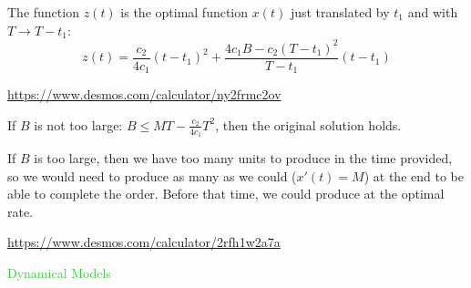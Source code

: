 \documentclass{workbook}
\begin{document}
\begin{solution}
\begin{slide}
\begin{parts}
	The function $z(t)$ is the optimal function $x(t)$ just translated by $t_1$ and with $T \to T-t_1$:
		\[ 
			z(t) = \frac{c_2}{4c_1} (t-t_1)^2 + \frac{4c_1 B-c_2 (T-t_1)^2}{T-t_1} (t-t_1)
		\]

	\url{https://www.desmos.com/calculator/ny2frmc2ov}
	
	\item If $B$ is not too large: $B\leq MT-\frac{c_{2}}{4c_{1}}T^{2}$, then the original solution holds.
		
		If $B$ is too large, then we have too many units to produce in the time provided, so we would need to produce as many as we could ($x'(t)=M$) at the end to be able to complete the order. 
		Before that time, we could produce at the optimal rate.

		\url{https://www.desmos.com/calculator/2rfh1w2a7a}
	
\end{parts}
\end{slide}
\end{solution}







%
%
%
%

\begin{slide}
\question

\begin{slidesonly}
	\vspace{3cm}
\end{slidesonly}

\begin{center}
\Huge 
\textcolor{LimeGreen}{Dynamical Models}
\end{center}

	
\end{slide}
\end{document}
